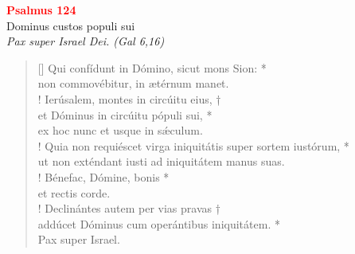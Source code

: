 


\def\greinitialformat#1{%
{\fontsize{39}{39}\selectfont #1}%
}




\vspace{0.3cm}
\begin{center}
 \textcolor{red}{\large \bf Psalmus 124}\\
Dominus custos populi sui\\
\textit{\small Pax super Israel Dei. (Gal 6,16)}
\end{center}
\begin{verse}[\versewidth]
Qui confídunt in Dómino, sicut mons Sion: *\\
non commovébitur, in ætérnum manet.\\!
\vin Ierúsalem, montes in circúitu eius, †\\
\vin et Dóminus in circúitu pópuli sui, *\\
\vin ex hoc nunc et usque in s\'{æ}culum.\\!
Quia non requiéscet virga iniquitátis super sortem iustórum, *\\
ut non exténdant iusti ad iniquitátem manus suas.\\!
\vin Bénefac, Dómine, bonis *\\
\vin et rectis corde.\\!
Declinántes autem per vias pravas †\\
addúcet Dóminus cum operántibus iniquitátem. *\\
Pax super Israel.\\
\end{verse}
\vspace{1cm}


